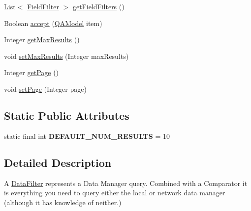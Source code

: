 \begin{DoxyCompactItemize}
\item 
List$<$ \hyperlink{classcom_1_1ualberta_1_1team17_1_1datamanager_1_1_data_filter_1_1_field_filter}{Field\+Filter} $>$ \hyperlink{classcom_1_1ualberta_1_1team17_1_1datamanager_1_1_data_filter_a1525fdc6e57f4dfa34a00a84ed8475a6}{get\+Field\+Filters} ()
\item 
Boolean \hyperlink{classcom_1_1ualberta_1_1team17_1_1datamanager_1_1_data_filter_a8d1b8a7265dd61f96a418d3ca50b5459}{accept} (\hyperlink{classcom_1_1ualberta_1_1team17_1_1_q_a_model}{Q\+A\+Model} item)
\item 
Integer \hyperlink{classcom_1_1ualberta_1_1team17_1_1datamanager_1_1_data_filter_a3ae1d88c647b0783b83475b11e4dbaf7}{get\+Max\+Results} ()
\item 
void \hyperlink{classcom_1_1ualberta_1_1team17_1_1datamanager_1_1_data_filter_a501386e6b7b0e1364759a5c8449af5f3}{set\+Max\+Results} (Integer max\+Results)
\item 
Integer \hyperlink{classcom_1_1ualberta_1_1team17_1_1datamanager_1_1_data_filter_ae38d28da071c8e83786b2aafb0dd76e0}{get\+Page} ()
\item 
void \hyperlink{classcom_1_1ualberta_1_1team17_1_1datamanager_1_1_data_filter_aa69d64c98292788be09b525d2e0186b7}{set\+Page} (Integer page)
\end{DoxyCompactItemize}
\subsection*{Static Public Attributes}
\begin{DoxyCompactItemize}
\item 
\hypertarget{classcom_1_1ualberta_1_1team17_1_1datamanager_1_1_data_filter_af8d3cecda4310bc59913a927da2456b5}{static final int {\bfseries D\+E\+F\+A\+U\+L\+T\+\_\+\+N\+U\+M\+\_\+\+R\+E\+S\+U\+L\+T\+S} = 10}\label{classcom_1_1ualberta_1_1team17_1_1datamanager_1_1_data_filter_af8d3cecda4310bc59913a927da2456b5}

\end{DoxyCompactItemize}


\subsection{Detailed Description}
A \hyperlink{classcom_1_1ualberta_1_1team17_1_1datamanager_1_1_data_filter}{Data\+Filter} represents a Data Manager query. Combined with a Comparator it is everything you need to query either the local or network data manager (although it has knowledge of neither.)

